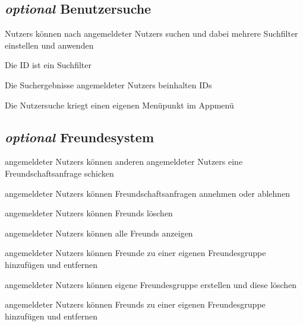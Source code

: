 	
	\subsection{{\em optional} Benutzersuche}
	
		\Glspl{Nutzer} können nach \glspl{angemeldeter Nutzer} suchen und dabei mehrere \gls{Suchfilter} einstellen und anwenden
		
		Die \gls{ID} ist ein \gls{Suchfilter}
		
		Die Suchergebnisse \glspl{angemeldeter Nutzer} beinhalten \glspl{ID}
		
		Die Nutzersuche kriegt einen eigenen Menüpunkt im Appmenü
		
		
		\subsection{{\em optional} Freundesystem}
	
	\Glspl{angemeldeter Nutzer} können anderen \glspl{angemeldeter Nutzer} eine Freundschaftsanfrage schicken
	
	\Glspl{angemeldeter Nutzer} können Freundschaftsanfragen annehmen oder ablehnen
	
	\Glspl{angemeldeter Nutzer} können \glspl{Freund} löschen

	\Glspl{angemeldeter Nutzer} können alle \glspl{Freund} anzeigen

	\Glspl{angemeldeter Nutzer} können Freunde zu einer eigenen Freundesgruppe hinzufügen und entfernen

		
	\Glspl{angemeldeter Nutzer} können eigene Freundesgruppe erstellen und diese löschen

	\Glspl{angemeldeter Nutzer} können \glspl{Freund} zu einer eigenen \gls{Freundesgruppe} hinzufügen und entfernen
	

